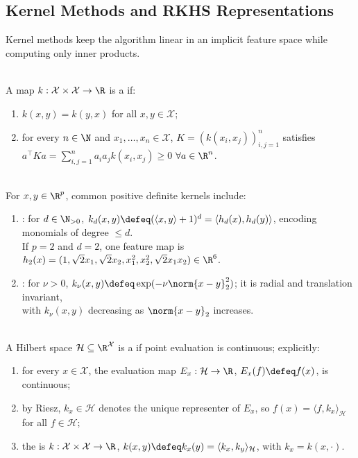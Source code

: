 \subsection{Kernel Methods and RKHS Representations}

Kernel methods keep the algorithm linear in an implicit feature space while computing only inner products.

\begin{definition} \label{def:sl-positive-definite-kernel} \\
A map $k:\mathcal{X}\times\mathcal{X}\to\R$ is a  if:
\begin{enumerate}[label=(\roman*)]
\setlength{\itemsep}{0pt}
\item $k(x,y)=k(y,x)$ for all $x,y\in\mathcal{X}$;
\item for every $n\in\N$ and $x_1,\ldots,x_n\in\mathcal{X}$, $K=(k(x_i,x_j))_{i,j=1}^n$ satisfies $a^\top K a=\sum\limits_{i,j=1}^n a_i a_j k(x_i,x_j)\geq0$ $\forall a\in\R^n$.
\end{enumerate}
\end{definition}

\begin{example} \label{ex:sl-common-kernels} \\
For $x,y\in\R^p$, common positive definite kernels include:
\begin{enumerate}[label=(\roman*)]
\setlength{\itemsep}{0pt}
\item {}: for $d\in\N_{>0}$, $k_d(x,y)\defeq(\langle x,y\rangle+1)^d=\langle h_d(x),h_d(y)\rangle$, encoding monomials of degree $\leq d$.\\
If $p=2$ and $d=2$, one feature map is $h_2(x)=(1,\sqrt{2}x_1,\sqrt{2}x_2,x_1^2,x_2^2,\sqrt{2}x_1x_2)\in\R^6$.
\item {}: for $\nu>0$, $k_\nu(x,y)\defeq\exp(-\nu\norm{x-y}_2^2)$; it is radial and translation invariant,\\
with $k_\nu(x,y)$ decreasing as $\norm{x-y}_2$ increases.
\end{enumerate}
\end{example}

\begin{definition} \label{def:sl-rkhs} \\
A Hilbert space $\mathcal{H}\subseteq\R^{\mathcal{X}}$ is a  if point evaluation is continuous; explicitly:
\begin{enumerate}[label=(\roman*)]
\setlength{\itemsep}{0pt}
\item for every $x\in\mathcal{X}$, the evaluation map $E_x:\mathcal{H}\to\R$, $E_x(f)\defeq f(x)$, is continuous;
\item by Riesz, $k_x\in\mathcal{H}$ denotes the unique representer of $E_x$, so $f(x)=\langle f,k_x\rangle_{\mathcal{H}}$ for all $f\in\mathcal{H}$;
\item the  is $k:\mathcal{X}\times\mathcal{X}\to\R$, $k(x,y)\defeq k_x(y)=\langle k_x,k_y\rangle_{\mathcal{H}}$, with $k_x=k(x,\cdot)$.
\end{enumerate}
\end{definition}

